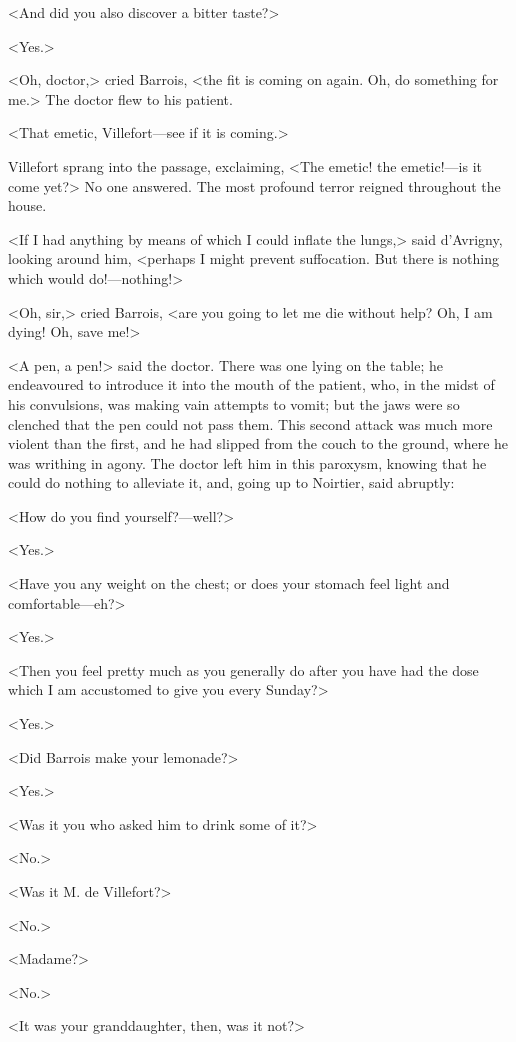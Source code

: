  <And did you also discover a bitter taste?> 

 <Yes.> 

 <Oh, doctor,> cried Barrois, <the fit is coming on again. Oh, do something for me.> The doctor flew to his patient. 

 <That emetic, Villefort—see if it is coming.> 

 Villefort sprang into the passage, exclaiming, <The emetic! the emetic!—is it come yet?> No one answered. The most profound terror reigned throughout the house. 

 <If I had anything by means of which I could inflate the lungs,> said d'Avrigny, looking around him, <perhaps I might prevent suffocation. But there is nothing which would do!—nothing!>

<Oh, sir,> cried Barrois, <are you going to let me die without help? Oh, I am dying! Oh, save me!> 

 <A pen, a pen!> said the doctor. There was one lying on the table; he endeavoured to introduce it into the mouth of the patient, who, in the midst of his convulsions, was making vain attempts to vomit; but the jaws were so clenched that the pen could not pass them. This second attack was much more violent than the first, and he had slipped from the couch to the ground, where he was writhing in agony. The doctor left him in this paroxysm, knowing that he could do nothing to alleviate it, and, going up to Noirtier, said abruptly: 

 <How do you find yourself?—well?> 

 <Yes.> 

 <Have you any weight on the chest; or does your stomach feel light and comfortable—eh?> 

 <Yes.> 

 <Then you feel pretty much as you generally do after you have had the dose which I am accustomed to give you every Sunday?> 

 <Yes.> 

 <Did Barrois make your lemonade?> 

 <Yes.> 

 <Was it you who asked him to drink some of it?> 

 <No.> 

 <Was it M. de Villefort?> 

 <No.> 

 <Madame?> 

 <No.> 

 <It was your granddaughter, then, was it not?> 

